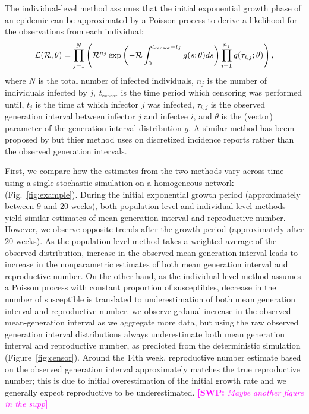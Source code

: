 \documentclass[12pt]{article}
\newcommand{\fref}[1]{Fig.~\ref{fig:#1}}
\newcommand{\RR}{\ensuremath{{\mathcal R}}}
\newcommand{\tsub}[2]{#1_{{\textrm{\tiny #2}}}}
\newcommand{\comment}[3]{\textcolor{#1}{\textbf{[#2: }\textsl{#3}\textbf{]}}}
\newcommand{\swp}[1]{\comment{magenta}{SWP}{#1}}
\begin{document}
The individual-level method assumes that the initial exponential growth phase of an epidemic can be approximated by a Poisson process to derive a likelihood for the observations from each individual:
\begin{equation}
\mathcal{L}(\RR, \theta) = \prod_{j=1}^N \left(\RR^{n_j} \exp \left(- \RR \int_0^{\tsub{t}{censor} - t_j} g(s;\theta) ds \right) \prod_{i=1}^{n_j} g(\tau_{i, j}; \theta) \right),
\end{equation}
where $N$ is the total number of infected individuals, $n_j$ is the number of individuals infected by $j$, $\tsub{t}{censor}$ is the time period which censoring was performed until, $t_j$ is the time at which infector $j$ was infected, $\tau_{i,j}$ is the observed generation interval between infector $j$ and infectee $i$, and $\theta$ is the (vector) parameter of the generation-interval distribution $g$.
A similar method has beem proposed by \cite{forsberg2008likelihood} but thier method uses on discretized incidence reports rather than the observed generation intervals.

First, we compare how the estimates from the two methods vary across time using a single stochastic simulation on a homogeneous network (\fref{example}).
During the initial exponential growth period (approximately between 9 and 20 weeks), both population-level and individual-level methods yield similar estimates of mean generation interval and reproductive number.
However, we observe opposite trends after the growth period (approximately after 20 weeks).
As the population-level method takes a weighted average of the observed distribution, increase in the observed mean generation interval leads to increase in the nonparametric estimates of both mean generation interval and reproductive number.
On the other hand, as the individual-level method assumes a Poisson process with constant proportion of susceptibles, decrease in the number of susceptible is translated to underestimation of both mean generation interval and reproductive number.
we observe grdaual increase in the observed mean-generation interval as we aggregate more data, but using the raw observed generation interval distributions always underestimate both mean generation interval and reproductive number, as predicted from the deterministic simulation (Figure~\ref{fig:censor}).
Around the 14th week, reproductive number estimate based on the observed generation interval approximately matches the true reproductive number; this is due to initial overestimation of the initial growth rate and we generally expect reproductive to be underestimated. \swp{Maybe another figure in the supp}
\end{document}
